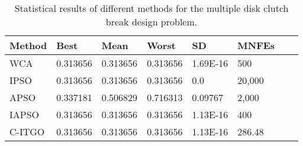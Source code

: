 
\begin{table*}[tp]
    \tiny
    \begin{center}
    
    \begin{tabular}{ P{2.0cm} P{2.0cm} P{2.0cm} P{2.0cm} P{2.0cm} P{2.0cm} P{2.0cm} P{2.0cm}  }
    \hline
    \textbf{Method} & \textbf{Best} & \textbf{Mean} & \textbf{Worst} & \textbf{SD} & \textbf{MNFEs} \\
    \hline

    WCA & 0.313656 & 0.313656 & 0.313656 & 1.69E-16 & 500 \\
    IPSO & 0.313656 & 0.313656 & 0.313656 & 0.0 & 20,000 \\
    APSO & 0.337181 & 0.506829 & 0.716313 & 0.09767 & 2,000 \\    
    IAPSO & 0.313656 & 0.313656 & 0.313656 & 1.13E-16 & 400 \\
    C-ITGO & 0.313656 & 0.313656 & 0.313656 & 1.13E-16 & 286.48 \\

    \hline
    \end{tabular}
    \end{center}
    \vspace*{-6mm}
    \caption{Statistical results of different methods for the multiple disk clutch break design problem. \\[1em]}
    \label{tab:MD}
    \end{table*}
    
    